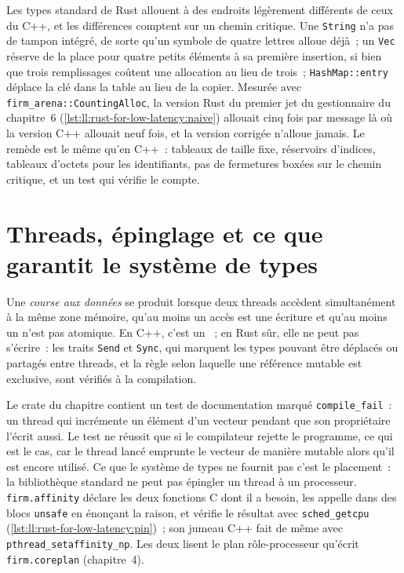 Les types standard de Rust allouent à des endroits légèrement différents de ceux du C++, et les différences comptent sur un chemin critique. Une
\texttt{String} n'a pas de tampon intégré, de sorte qu'un symbole de quatre lettres alloue déjà~; un \texttt{Vec} réserve de la place pour
quatre petits éléments à sa première insertion, si bien que trois remplissages coûtent une allocation au lieu de trois~; \texttt{HashMap::entry}
déplace la clé dans la table au lieu de la copier. Mesurée avec \texttt{firm\_arena::CountingAlloc}, la version Rust du premier jet du
gestionnaire du chapitre~6 (\cref{lst:ll:rust-for-low-latency:naive}) allouait cinq fois par message là où la version C++ allouait neuf fois,
et la version corrigée n'alloue jamais. Le remède est le même qu'en C++~: tableaux de taille fixe, réservoirs d'indices, tableaux d'octets
pour les identifiants, pas de fermetures boxées sur le chemin critique, et un test qui vérifie le compte.

\label{lst:ll:rust-for-low-latency:naive}

\section{Threads, épinglage et ce que garantit le système de types}

\begin{definition}\label{def:ll:rust-for-low-latency:race}
Une \emph{course aux données} se produit lorsque deux threads accèdent simultanément à la même zone mémoire, qu'au moins
un accès est une écriture et qu'au moins un n'est pas atomique. En C++, c'est un ~; en Rust sûr, elle ne peut pas
s'écrire~: les traits \texttt{Send} et \texttt{Sync}, qui marquent les types pouvant être déplacés ou partagés entre threads, et la règle
selon laquelle une référence mutable est exclusive, sont vérifiés à la compilation.
\end{definition}

Le crate du chapitre contient un test de documentation marqué \texttt{compile\_fail}~: un thread qui incrémente un élément d'un
vecteur pendant que son propriétaire l'écrit aussi. Le test ne réussit que si le compilateur rejette le programme, ce qui est le cas,
car le thread lancé emprunte le vecteur de manière mutable alors qu'il est encore utilisé. Ce que le système de types ne fournit pas
c'est le placement~: la bibliothèque standard ne peut pas épingler un thread à un processeur. \texttt{firm.affinity} déclare les deux fonctions C dont il a besoin,
les appelle dans des blocs \texttt{unsafe} en énonçant la raison, et vérifie le résultat avec \texttt{sched\_getcpu}
(\cref{lst:ll:rust-for-low-latency:pin})~; son jumeau C++ fait de même avec \texttt{pthread\_setaffinity\_np}. Les deux lisent
le plan rôle-processeur qu'écrit \texttt{firm.coreplan} (chapitre~4).

